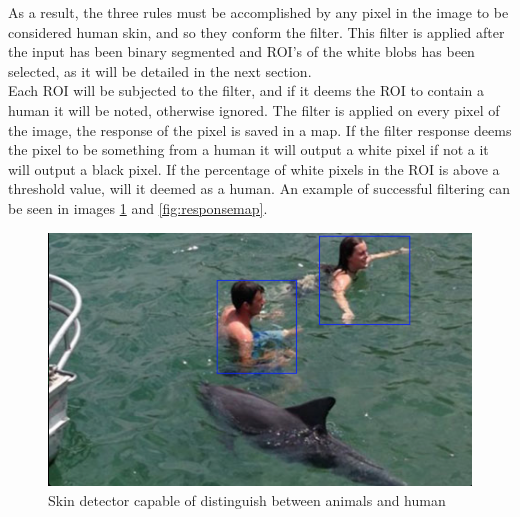 As a result, the three rules must be accomplished by any pixel in the image to be considered human skin, and so they conform the filter.
This filter is applied after the input has been binary segmented and  ROI's of the white blobs has been selected, as it will be detailed in the next section.\\

Each ROI will be subjected to the filter, and if it deems the ROI to contain a human it will be noted, otherwise ignored. 
The filter is applied on every pixel of the image, the response of the pixel is saved in a map. 
If the filter response deems the pixel to be something from a human it will output a white pixel if not a it will output a black pixel.  
If the percentage of white pixels in the ROI is above a threshold value, will it deemed as a human.
An example of successful filtering can be seen in images \ref{fig:humanAndDolphin} and \ref{fig:responsemap}. 

\begin{figure}[H]
    \centering
        \includegraphics[scale=0.7]{Images/humanDolphin.png}
    \caption{Skin detector capable of distinguish between animals and human}
    \label{fig:humanAndDolphin}
\end{figure}


